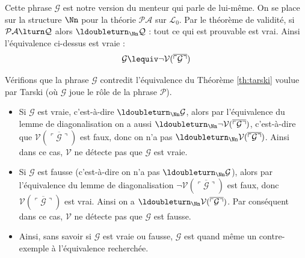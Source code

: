 \documentclass[11pt,class=report,crop=false]{standalone}
\begin{document}
Cette phrase $\mathcal{G}$ est notre version du menteur qui parle de lui-même.
    On se place sur la structure $\Nn$ pour la théorie $\mathcal{PA}$ sur $\mathcal{L}_0$.
    Par le théorème de validité, si $\mathcal{PA} \lturn \mathcal{Q}$ alors $\ldoubleturn_{\Nn} \mathcal{Q}$ : tout ce qui est prouvable est vrai. 
    Ainsi l'équivalence ci-dessus est vraie :
    \[ \mathcal{G} \lequiv \lnot \mathcal{V}(\overline{\ulcorner \mathcal{G} \urcorner}) \]

Vérifions que la phrase $\mathcal{G}$ contredit l'équivalence du Théorème \ref{th:tarski} voulue par Tarski (où $\mathcal{G}$ joue le rôle de la phrase $\mathcal{P}$).
\begin{itemize}    
    \item Si $\mathcal{G}$ est vraie, c'est-à-dire $\ldoubleturn_{\Nn} \mathcal{G}$, alors par l'équivalence du lemme de diagonalisation on a aussi $\ldoubleturn_{\Nn} \lnot \mathcal{V}(\overline{\ulcorner \mathcal{G} \urcorner})$, c'est-à-dire que $\mathcal{V}(\overline{\ulcorner \mathcal{G} \urcorner})$ est faux, donc on n'a pas $\ldoubleturn_{\Nn} \mathcal{V}(\overline{\ulcorner \mathcal{G} \urcorner})$. Ainsi dans ce cas, $\mathcal{V}$ ne détecte pas que $\mathcal{G}$ est vraie.
    
    \item Si $\mathcal{G}$ est fausse (c'est-à-dire on n'a pas $\ldoubleturn_{\Nn} \mathcal{G}$), alors par l'équivalence du lemme de diagonalisation $\lnot \mathcal{V}(\overline{\ulcorner \mathcal{G} \urcorner})$ est faux, donc $\mathcal{V}(\overline{\ulcorner \mathcal{G} \urcorner})$ est vrai. Ainsi on a $\ldoubleturn_{\Nn} \mathcal{V}(\overline{\ulcorner \mathcal{G} \urcorner})$. Par conséquent dans ce cas, $\mathcal{V}$ ne détecte pas que $\mathcal{G}$ est fausse.
    
    \item Ainsi, sans savoir si $\mathcal{G}$ est vraie ou fausse, $\mathcal{G}$ est quand même un contre-exemple à l'équivalence recherchée.
\end{itemize}




\begin{exercicecours}

\end{exercicecours}

\end{document}
